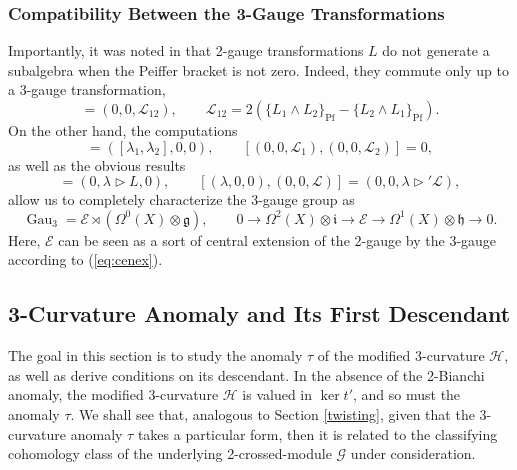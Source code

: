 \documentclass[onecolumn]{article}
\theoremstyle{theorem}
\theoremstyle{remark}
\theoremstyle{example}
\theoremstyle{definition}
\numberwithin{equation}{section}
\begin{document}
\subsubsection{Compatibility Between the 3-Gauge Transformations}
Importantly, it was noted in  \cite{Radenkovic:2019qme} that 2-gauge transformations $L$ do not generate a subalgebra when the Peiffer bracket is not zero. Indeed, they commute only up to a 3-gauge transformation,
\begin{equation}
    [(0,L_1,0), (0,L_2,0)] = (0,0,\mathcal{L}_{12}),\qquad \mathcal{L}_{12}=2(\{L_1\wedge L_2\}_\text{Pf}-\{L_2\wedge L_1\}_\text{Pf}).\label{eq:cenex}
\end{equation}
{On} the other hand, the computations
\begin{equation}
    [(\lambda_1,0,0),(\lambda_2,0,0)] = ([\lambda_1,\lambda_2],0,0),\qquad [(0,0,\mathcal{L}_1),(0,0,\mathcal{L}_2)] =0,\nonumber
\end{equation}
as well as the obvious results
\begin{equation}
    [(\lambda,0,0),(0,L,0)] = (0,\lambda\rhd L,0),\qquad [(\lambda,0,0),(0,0,\mathcal{L})] = (0,0,\lambda\rhd'\mathcal{L}), \nonumber
\end{equation}
allow us to completely characterize the 3-gauge group as
\begin{equation}
    \operatorname{Gau}_3 = \mathscr{E}\rtimes (\Omega^0(X)\otimes\mathfrak{g}),\qquad 0\rightarrow \Omega^2(X)\otimes\mathfrak{i}\rightarrow \mathscr{E}\rightarrow\Omega^1(X)\otimes\mathfrak{h}\rightarrow 0.\nonumber
\end{equation}
{Here}, $\mathscr{E}$ can be seen as a sort of central extension of the 2-gauge by the 3-gauge according to (\ref{eq:cenex}).


\subsection{3-Curvature Anomaly and Its First Descendant}\label{3anom}
The goal in this section is to study the anomaly $\tau$ of the modified 3-curvature $\mathcal{H}$, as well as derive conditions on its descendant. In the absence of the 2-Bianchi anomaly, the modified 3-curvature $\mathcal{H}$ is valued in $\operatorname{ker}t'$, and so must the anomaly $\tau$. We shall see that, analogous to Section \ref{twisting}, given that the 3-curvature anomaly $\tau$ takes a particular form, then it is related to the classifying cohomology class of the underlying 2-crossed-module $\mathscr{G}$ under consideration.
\end{document}
